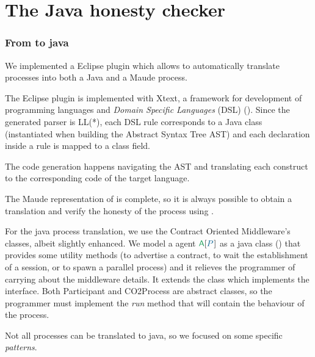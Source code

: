
\section{The Java honesty checker}\label{sec:java-honesty}



\subsubsection{From \coco to java }
We implemented a \coco Eclipse plugin which allows to automatically
translate \coco processes into both a Java and a Maude process. 

The \coco Eclipse plugin is implemented with Xtext, a framework for
development of programming languages and \textit{Domain Specific
  Languages} (DSL) ().
Since the generated parser is LL(*), each DSL rule corresponds to a
Java class (instantiated when building the Abstract Syntax Tree AST) and
each declaration inside a rule is mapped to a class field.

The code generation happens navigating the AST and translating each
\coco construct to the corresponding code of the target language.

The Maude representation of \coco is complete, so it is always possible to
obtain a translation and verify the honesty of the process using
\cite{verifiable}.

For the java process translation, we use the Contract Oriented
Middleware's classes, albeit slightly enhanced. 
We model a \coco agent $\sys{\pmv{A}}{\procP}$ as a java class 
() that provides some utility methods (\eg to advertise
a contract, to wait the establishment of a session, or to spawn a \coco
parallel process) and it relieves the programmer of carrying about the
middleware details. It extends the class  which
implements the  interface. 
%
Both Participant and CO2Process are abstract classes, so the programmer must
implement the \emph{run} method that will contain the behaviour of the process.

Not all \coco processes can be translated to java, so we focused on some
specific \coco \emph{patterns}.


